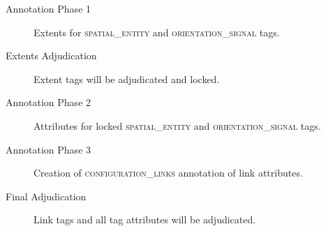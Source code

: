 \documentclass[11pt]{article}
\begin{document}
\begin{description}
    \item[Annotation Phase 1] Extents for \textsc{spatial\_entity} and \textsc{orientation\_signal} tags.
    \item[Extents Adjudication] Extent tags will be adjudicated and locked.
    \item[Annotation Phase 2] Attributes for locked \textsc{spatial\_entity} and \textsc{orientation\_signal} tags.
    \item[Annotation Phase 3] Creation of \textsc{configuration\_links} annotation of link attributes.
    \item[Final Adjudication] Link tags and all tag attributes will be adjudicated.
\end{description}
\label{desc:phases}


\end{document}
